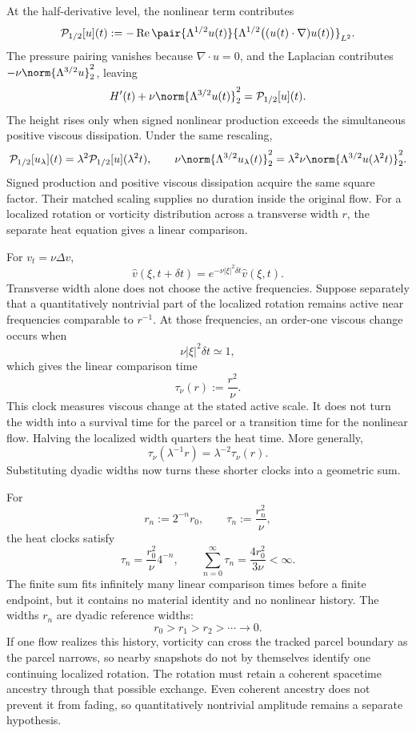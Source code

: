 
At the half-derivative level, the nonlinear term contributes
\[
  \mathcal P_{1/2}[u](t)
  :=
  -\operatorname{Re}
  \pair
    {\Lambda^{1/2}u(t)}
    {\Lambda^{1/2}\bigl((u(t)\cdot\nabla)u(t)\bigr)}_{L^2}.
\]
The pressure pairing vanishes because \(\nabla\cdot u=0\), and the Laplacian contributes \(-\nu\norm{\Lambda^{3/2}u}_2^2\), leaving
\[
  H'(t)
  +
  \nu\norm{\Lambda^{3/2}u(t)}_2^2
  =
  \mathcal P_{1/2}[u](t).
\]
The height rises only when signed nonlinear production exceeds the simultaneous positive viscous dissipation. Under the same rescaling,
\[
  \mathcal P_{1/2}[u_\lambda](t)
  =
  \lambda^2\mathcal P_{1/2}[u](\lambda^2t),
  \qquad
  \nu\norm{\Lambda^{3/2}u_\lambda(t)}_2^2
  =
  \lambda^2\nu\norm{\Lambda^{3/2}u(\lambda^2t)}_2^2.
\]
Signed production and positive viscous dissipation acquire the same square factor. Their matched scaling supplies no duration inside the original flow. For a localized rotation or vorticity distribution across a transverse width \(r\), the separate heat equation gives a linear comparison.


For \(v_t=\nu\Delta v\),
\[
  \widehat v(\xi,t+\delta t)
  =
  e^{-\nu|\xi|^2\delta t}\widehat v(\xi,t).
\]
Transverse width alone does not choose the active frequencies. Suppose separately that a quantitatively nontrivial part of the localized rotation remains active near frequencies comparable to \(r^{-1}\). At those frequencies, an order-one viscous change occurs when
\[
  \nu|\xi|^2\delta t\simeq1,
\]
which gives the linear comparison time
\[
  \tau_\nu(r)
  :=
  \frac{r^2}{\nu}.
\]
This clock measures viscous change at the stated active scale. It does not turn the width into a survival time for the parcel or a transition time for the nonlinear flow. Halving the localized width quarters the heat time. More generally,
\[
  \tau_\nu(\lambda^{-1}r)
  =
  \lambda^{-2}\tau_\nu(r).
\]
Substituting dyadic widths now turns these shorter clocks into a geometric sum.


For
\[
  r_n:=2^{-n}r_0,
  \qquad
  \tau_n:=\frac{r_n^2}{\nu},
\]
the heat clocks satisfy
\[
  \tau_n
  =
  \frac{r_0^2}{\nu}4^{-n},
  \qquad
  \sum_{n=0}^{\infty}\tau_n
  =
  \frac{4r_0^2}{3\nu}
  <
  \infty.
\]
The finite sum fits infinitely many linear comparison times before a finite endpoint, but it contains no material identity and no nonlinear history. The widths \(r_n\) are dyadic reference widths:
\[
  r_0>r_1>r_2>\cdots\longrightarrow0.
\]
If one \NavierStokes{} flow realizes this history, vorticity can cross the tracked parcel boundary as the parcel narrows, so nearby snapshots do not by themselves identify one continuing localized rotation. The rotation must retain a coherent spacetime ancestry through that possible exchange. Even coherent ancestry does not prevent it from fading, so quantitatively nontrivial amplitude remains a separate hypothesis.

